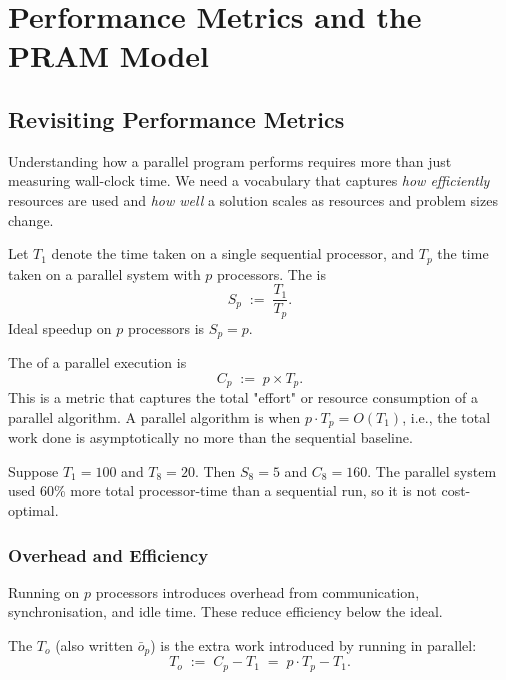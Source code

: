 \chapter{Performance Metrics and the PRAM Model}

\section{Revisiting Performance Metrics}

Understanding how a parallel program performs requires more than just measuring
wall-clock time. We need a vocabulary that captures \emph{how efficiently}
resources are used and \emph{how well} a solution scales as resources and
problem sizes change.

\begin{ppdefn}
Let $T_1$ denote the time taken on a single sequential processor, and $T_p$ the
time taken on a parallel system with $p$ processors. The  is
\[
  S_p \;:=\; \frac{T_1}{T_p}.
\]
Ideal speedup on $p$ processors is $S_p = p$.
\end{ppdefn}

\begin{ppdefn}
The  of a parallel execution is
\[
  C_p \;:=\; p \times T_p.
\]
This is a metric that captures the total "effort" or resource consumption of a parallel algorithm. A parallel algorithm is
 when $p \cdot T_p = O(T_1)$, i.e., the total work
done is asymptotically no more than the sequential baseline.
\end{ppdefn}

\begin{ppexample}
Suppose $T_1 = 100$ and $T_8 = 20$. Then $S_8 = 5$ and $C_8 = 160$. The
parallel system used 60\% more total processor-time than a sequential run,
so it is not cost-optimal.
\end{ppexample}

\subsection{Overhead and Efficiency}

Running on $p$ processors introduces overhead from communication,
synchronisation, and idle time. These reduce efficiency below the ideal.

\begin{ppdefn}
The  $T_o$ (also written $\bar{o}_p$) is the
extra work introduced by running in parallel:
\[
  T_o \;:=\; C_p - T_1 \;=\; p \cdot T_p - T_1.
\]
\end{ppdefn}

